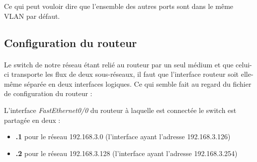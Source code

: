 \documentclass[12pt,a4paper,notitlepage]{article}
\begin{document}
\begin{center}
 \end{center}
 
Ce qui peut vouloir dire que l'ensemble des autres ports sont dans le même VLAN par défaut.

\subsection{Configuration du routeur}
\paragraph{}Le switch de notre réseau étant relié au routeur par un seul médium et que celui-ci transporte les flux de deux sous-réseaux, il faut que l'interface routeur soit elle-même séparée en deux interfaces logiques. Ce qui semble fait au regard du fichier de configuration du routeur :


\begin{center}
 \end{center}



L'interface \textit{FastEthernet0/0} du routeur à laquelle est connectée le switch est partagée en deux : 
\begin{itemize}
\item \textbf{.1} pour le réseau 192.168.3.0 (l'interface ayant l'adresse 192.168.3.126)
\item \textbf{.2 }pour le réseau 192.168.3.128 (l'interface ayant l'adresse 192.168.3.254)
\end{itemize}
\end{document}
